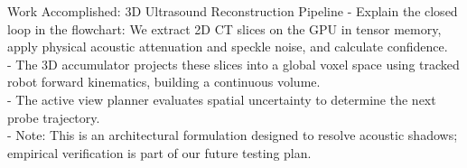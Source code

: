 \documentclass[aspectratio=169, 10pt]{beamer}
\begin{document}
\begin{frame}{Work Accomplished: 3D Ultrasound Reconstruction Pipeline}
{        - Explain the closed loop in the flowchart: We extract 2D CT slices on the GPU in tensor memory, apply physical acoustic attenuation and speckle noise, and calculate confidence.\\
        - The 3D accumulator projects these slices into a global voxel space using tracked robot forward kinematics, building a continuous volume.\\
        - The active view planner evaluates spatial uncertainty to determine the next probe trajectory.\\
        - Note: This is an architectural formulation designed to resolve acoustic shadows; empirical verification is part of our future testing plan.
    }
\end{frame}

\end{document}
